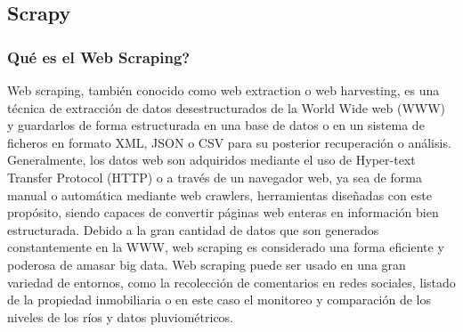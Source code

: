 \newpage

\subsection{Scrapy}

\subsubsection{Qué es el Web Scraping?}
Web scraping, también conocido como web extraction o web harvesting, es una técnica de extracción de datos desestructurados de la World Wide web (WWW) y guardarlos de forma estructurada en una base de datos o en un sistema de ficheros en formato XML, JSON o CSV para su posterior recuperación o análisis. Generalmente, los datos web son adquiridos mediante el uso de Hyper-text Transfer Protocol (HTTP) o a través de un navegador web, ya sea de forma manual o automática mediante web crawlers, herramientas diseñadas con este propósito, siendo capaces de convertir páginas web enteras en información bien estructurada. \cite{zhao2017web} \cite{krotov2018legality}
\newline
\newline
Debido a la gran cantidad de datos que son generados constantemente en la WWW, web scraping es considerado una forma eficiente y poderosa de amasar big data.
\newline
\newline
Web scraping puede ser usado en una gran variedad de entornos, como la recolección de comentarios en redes sociales, listado de la propiedad inmobiliaria o en este caso el monitoreo y comparación de los niveles de los ríos y datos pluviométricos.

